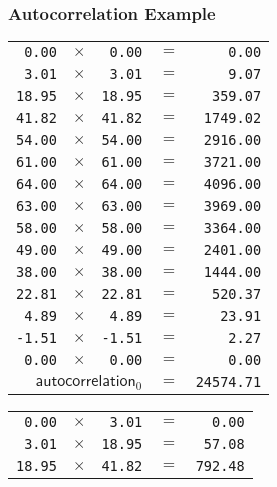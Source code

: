 \subsubsection{Autocorrelation Example}
{
\begin{multicols}{2}
\begin{tabular}{rrrrr}
  \texttt{0.00} & $\times$ & \texttt{0.00} & $=$ & \texttt{0.00} \\
  \texttt{3.01} & $\times$ & \texttt{3.01} & $=$ & \texttt{9.07} \\
  \texttt{18.95} & $\times$ & \texttt{18.95} & $=$ & \texttt{359.07} \\
  \texttt{41.82} & $\times$ & \texttt{41.82} & $=$ & \texttt{1749.02} \\
  \texttt{54.00} & $\times$ & \texttt{54.00} & $=$ & \texttt{2916.00} \\
  \texttt{61.00} & $\times$ & \texttt{61.00} & $=$ & \texttt{3721.00} \\
  \texttt{64.00} & $\times$ & \texttt{64.00} & $=$ & \texttt{4096.00} \\
  \texttt{63.00} & $\times$ & \texttt{63.00} & $=$ & \texttt{3969.00} \\
  \texttt{58.00} & $\times$ & \texttt{58.00} & $=$ & \texttt{3364.00} \\
  \texttt{49.00} & $\times$ & \texttt{49.00} & $=$ & \texttt{2401.00} \\
  \texttt{38.00} & $\times$ & \texttt{38.00} & $=$ & \texttt{1444.00} \\
  \texttt{22.81} & $\times$ & \texttt{22.81} & $=$ & \texttt{520.37} \\
  \texttt{4.89} & $\times$ & \texttt{4.89} & $=$ & \texttt{23.91} \\
  \texttt{-1.51} & $\times$ & \texttt{-1.51} & $=$ & \texttt{2.27} \\
  \texttt{0.00} & $\times$ & \texttt{0.00} & $=$ & \texttt{0.00} \\
  \hline
  \multicolumn{3}{r}{$\textsf{autocorrelation}_0$} & $=$ & \texttt{24574.71} \\
\end{tabular}
\par
\begin{tabular}{rrrrr}
  \texttt{0.00} & $\times$ & \texttt{3.01} & $=$ & \texttt{0.00} \\
  \texttt{3.01} & $\times$ & \texttt{18.95} & $=$ & \texttt{57.08} \\
  \texttt{18.95} & $\times$ & \texttt{41.82} & $=$ & \texttt{792.48} \\

\end{tabular}
\end{multicols}}
